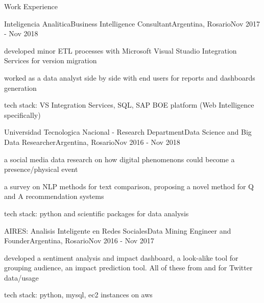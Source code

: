 \documentclass{article}
\newlength{\tabin}
\newlength{\secsep}
\newcommand{\lineunder}{\vspace*{-8pt} \\ \hspace*{-6pt} \hrulefill \\ \vspace*{-15pt}}
\newenvironment{tabbedsection}[1]{
  \begin{list}{}{
      \setlength{\itemsep}{0pt}
      \setlength{\labelsep}{0pt}
      \setlength{\labelwidth}{0pt}
      \setlength{\leftmargin}{\tabin}
      \setlength{\rightmargin}{\tabin}
      \setlength{\listparindent}{0pt}
      \setlength{\parsep}{0pt}
      \setlength{\parskip}{0pt}
      \setlength{\partopsep}{0pt}
      \setlength{\topsep}{#1}
    }
  \item[]
}{\end{list}}
\newenvironment{resume_section}[1]{
  \filbreak
  \vspace{2\secsep}
  \textsc{\large#1}
  \lineunder
  \begin{tabbedsection}{\secsep}
}{\end{tabbedsection}}
\newenvironment{subitems}{
  \renewcommand{\labelitemi}{-}
  \begin{itemize}
      \setlength{\labelsep}{1em}
}{\end{itemize}}
\newenvironment{resume_employer}[4]{
  \vspace{\secsep}
  \textbf{#1} \\ 
  \indent {\small #2} \hfill {\footnotesize#3 (#4)}
  \begin{tabbedsection}{0pt}
  \begin{subitems}
}{\end{subitems}\end{tabbedsection}}
\begin{document}
\begin{resume_section}{Work Experience}
  \begin{resume_employer}{Inteligencia Analitica}{Business Intelligence Consultant}{Argentina, Rosario}{Nov 2017 - Nov 2018}
    \item developed minor ETL processes with Microsoft Visual Stuadio Integration Services for version migration
    \item worked as a data analyst side by side with end users for reports and dashboards generation
    \item tech stack: VS Integration Services, SQL, SAP BOE platform (Web Intelligence specifically)
  \end{resume_employer}
  
  \begin{resume_employer}{Universidad Tecnologica Nacional - Research Department}{Data Science and Big Data Researcher}{Argentina, Rosario}{Nov 2016 - Nov 2018}
    \item a social media data research on how digital phenomenons could become a presence/physical event
    \item a survey on NLP methods for text comparison, proposing a novel method for Q and A recommendation systems
    \item tech stack: python and scientific packages for data analysis
  \end{resume_employer}
  
  \begin{resume_employer}{AIRES: Analisis Inteligente en Redes Sociales}{Data Mining Engineer and Founder}{Argentina, Rosario}{Nov 2016 - Nov 2017}
    \item developed a sentiment analysis and impact dashboard, a look-alike tool for grouping audience, an impact prediction tool. All of these from and for Twitter data/usage
    \item tech stack: python, mysql, ec2 instances on aws
  \end{resume_employer}  
\end{resume_section}
\end{document}
